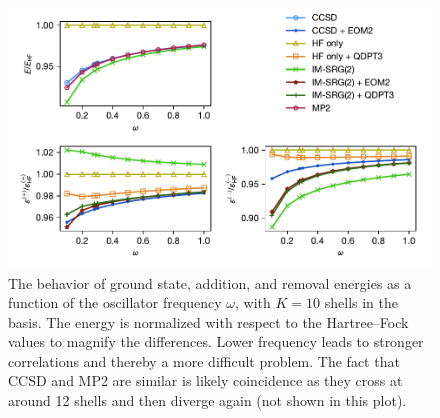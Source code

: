 \begin{figure}
  \centering
  \includegraphics{fig-by-freq-10-6-normal}
  \caption{The behavior of ground state, addition, and removal energies as a function of the oscillator frequency $\omega$, with $K = 10$ shells in the basis.  The energy is normalized with respect to the Hartree--Fock values to magnify the differences.  Lower frequency leads to stronger correlations and thereby a more difficult problem.  The fact that CCSD and MP2 are similar is likely coincidence as they cross at around 12 shells and then diverge again (not shown in this plot).}
  \label{fig:by-freq-10-6-normal}
\end{figure}

